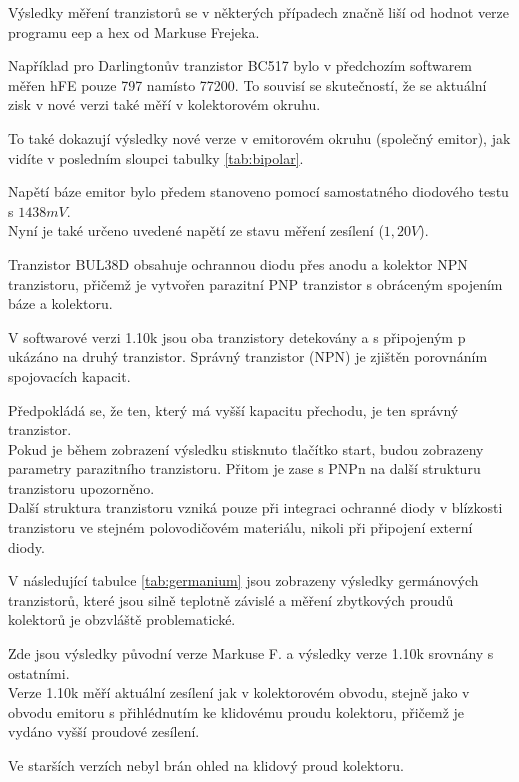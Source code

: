 Výsledky měření tranzistorů se v některých případech značně liší od hodnot verze
programu eep a hex od Markuse Frejeka.

Například pro Darlingtonův tranzistor BC517 bylo v předchozím softwarem měřen hFE pouze 797 namísto 77200.
To souvisí se skutečností, že se aktuální zisk v nové verzi také měří v kolektorovém okruhu.

To také dokazují výsledky nové verze v emitorovém okruhu (společný emitor),
jak vidíte v posledním sloupci tabulky \ref{tab:bipolar}.

Napětí báze emitor bylo předem stanoveno pomocí samostatného diodového testu s \(1438mV\).\\
Nyní je také určeno uvedené napětí ze stavu měření zesílení (\(1,20V\)).

Tranzistor BUL38D obsahuje ochrannou diodu přes anodu a kolektor NPN tranzistoru,
přičemž je vytvořen parazitní PNP tranzistor s obráceným spojením báze a kolektoru.

V softwarové verzi 1.10k jsou oba tranzistory detekovány a s připojeným p ukázáno na druhý tranzistor.
Správný tranzistor (NPN) je zjištěn porovnáním spojovacích kapacit.

Předpokládá se, že ten, který má vyšší kapacitu přechodu, je ten správný tranzistor.\\
Pokud je během zobrazení výsledku stisknuto tlačítko start, budou zobrazeny parametry parazitního tranzistoru. Přitom je zase s PNPn na další strukturu tranzistoru upozorněno.\\
Další struktura tranzistoru vzniká pouze při integraci ochranné diody v blízkosti tranzistoru ve stejném polovodičovém materiálu, nikoli při připojení externí diody.

V následující tabulce \ref{tab:germanium} jsou zobrazeny výsledky germánových tranzistorů,
které jsou silně teplotně závislé a měření zbytkových proudů kolektorů je obzvláště problematické.

Zde jsou výsledky původní verze Markuse F. a výsledky verze 1.10k srovnány s ostatními.\\
Verze 1.10k měří aktuální zesílení jak v kolektorovém obvodu, stejně jako v obvodu emitoru s přihlédnutím ke klidovému proudu kolektoru, přičemž je vydáno vyšší proudové zesílení.

Ve starších verzích nebyl brán ohled na klidový proud kolektoru.

